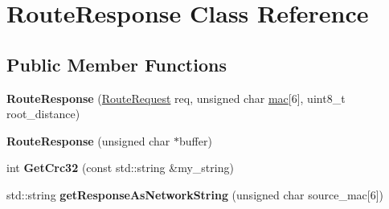 \hypertarget{classRouteResponse}{\section{Route\-Response Class Reference}
\label{classRouteResponse}
}
\subsection*{Public Member Functions}
\begin{DoxyCompactItemize}
\item 
\hypertarget{classRouteResponse_a897437599b52149a64d005407b778fdd}{{\bfseries Route\-Response} (\hyperlink{classRouteRequest}{Route\-Request} req, unsigned char \hyperlink{structmac}{mac}\mbox{[}6\mbox{]}, uint8\-\_\-t root\-\_\-distance)}\label{classRouteResponse_a897437599b52149a64d005407b778fdd}

\item 
\hypertarget{classRouteResponse_a47e56d193254e70eccd7be64d80180c6}{{\bfseries Route\-Response} (unsigned char $\ast$buffer)}\label{classRouteResponse_a47e56d193254e70eccd7be64d80180c6}

\item 
\hypertarget{classRouteResponse_a69a843212ab6c0dfc1fa6354e124399b}{int {\bfseries Get\-Crc32} (const std\-::string \&my\-\_\-string)}\label{classRouteResponse_a69a843212ab6c0dfc1fa6354e124399b}

\item 
\hypertarget{classRouteResponse_ab45b7284ad65c5c88613b048af038f12}{std\-::string {\bfseries get\-Response\-As\-Network\-String} (unsigned char source\-\_\-mac\mbox{[}6\mbox{]})}\label{classRouteResponse_ab45b7284ad65c5c88613b048af038f12}

\end{DoxyCompactItemize}
